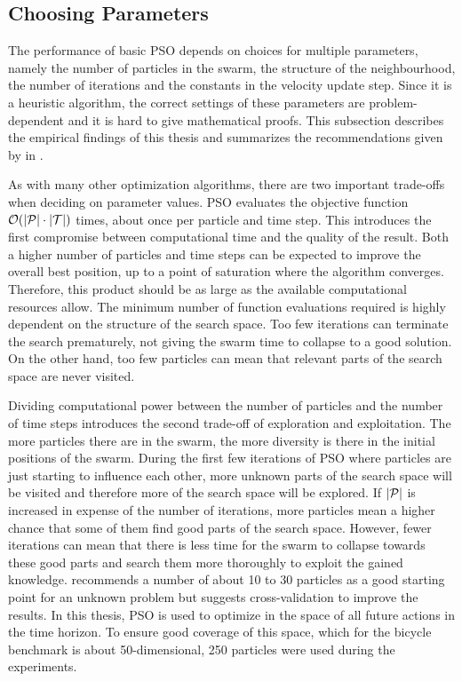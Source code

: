 \subsection{Choosing Parameters}
The performance of basic PSO depends on choices for multiple parameters, namely the number of particles in the swarm, the structure of the neighbourhood, the number of iterations and the constants in the velocity update step.
Since it is a heuristic algorithm, the correct settings of these parameters are problem-dependent and it is hard to give mathematical proofs.
This subsection describes the empirical findings of this thesis and summarizes the recommendations given by \citeauthor{engelbrecht_fundamentals_2006} in \cite{engelbrecht_fundamentals_2006}.

As with many other optimization algorithms, there are two important trade-offs when deciding on parameter values.
PSO evaluates the objective function $\Oh(\abs{\Pe} \cdot \abs{\Tee})$ times, about once per particle and time step.
This introduces the first compromise between computational time and the quality of the result.
Both a higher number of particles and time steps can be expected to improve the overall best position, up to a point of saturation where the algorithm converges.
Therefore, this product should be as large as the available computational resources allow.
The minimum number of function evaluations required is highly dependent on the structure of the search space.
Too few iterations can terminate the search prematurely, not giving the swarm time to collapse to a good solution.
On the other hand, too few particles can mean that relevant parts of the search space are never visited.

Dividing computational power between the number of particles and the number of time steps introduces the second trade-off of exploration and exploitation.
The more particles there are in the swarm, the more diversity is there in the initial positions of the swarm.
During the first few iterations of PSO where particles are just starting to influence each other, more unknown parts of the search space will be visited and therefore more of the search space will be explored.
If $\abs{\Pe}$ is increased in expense of the number of iterations, more particles mean a higher chance that some of them find good parts of the search space.
However, fewer iterations can mean that there is less time for the swarm to collapse towards these good parts and search them more thoroughly to exploit the gained knowledge.
\citeauthor{engelbrecht_fundamentals_2006} recommends a number of about 10 to 30 particles as a good starting point for an unknown problem but suggests cross-validation to improve the results.
In this thesis, PSO is used to optimize in the space of all future actions in the time horizon.
To ensure good coverage of this space, which for the bicycle benchmark is about 50-dimensional, 250 particles were used during the experiments.

